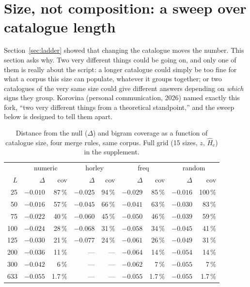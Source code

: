 \documentclass[11pt,a4paper]{article}
\newcommand{\Hcn}{\hat H_{\mathrm{c}}}
\begin{document}
\section{Size, not composition: a sweep over catalogue length}
\label{sec:sweep}

Section~\ref{sec:ladder} showed that changing the catalogue moves the number. This section asks why. Two very different things could be going on, and only one of them is really about the script: a longer catalogue could simply be too fine for what a corpus this size can populate, whatever it groups together; or two catalogues of the very same size could give different answers depending on \emph{which} signs they group. Korovina (personal communication, 2026) named exactly this fork, ``two very different things from a theoretical standpoint,'' and the sweep below is designed to tell them apart.

\begin{table}[t]
\centering\small
\begin{tabular}{r rr rr rr rr}
\toprule
 & \multicolumn{2}{c}{numeric} & \multicolumn{2}{c}{horley} & \multicolumn{2}{c}{freq} & \multicolumn{2}{c}{random} \\
$L$ & $\Delta$ & cov & $\Delta$ & cov & $\Delta$ & cov & $\Delta$ & cov \\
\midrule
25  & $-0.010$ & 87\,\% & $-0.025$ & 94\,\% & $-0.029$ & 85\,\% & $-0.016$ & 100\,\% \\
50  & $-0.016$ & 57\,\% & $-0.045$ & 66\,\% & $-0.041$ & 63\,\% & $-0.030$ & 83\,\% \\
75  & $-0.022$ & 40\,\% & $-0.060$ & 45\,\% & $-0.050$ & 46\,\% & $-0.039$ & 59\,\% \\
100 & $-0.024$ & 28\,\% & $-0.068$ & 31\,\% & $-0.058$ & 34\,\% & $-0.045$ & 41\,\% \\
125 & $-0.030$ & 21\,\% & $\mathbf{-0.077}$ & 24\,\% & $-0.061$ & 26\,\% & $-0.049$ & 31\,\% \\
200 & $-0.036$ & 11\,\% & --- & --- & $-0.064$ & 14\,\% & $-0.054$ & 14\,\% \\
300 & $-0.042$ & 6\,\% & --- & --- & $-0.062$ & 7\,\% & $-0.055$ & 7\,\% \\
633 & $-0.055$ & 1.7\,\% & --- & --- & $-0.055$ & 1.7\,\% & $-0.055$ & 1.7\,\% \\
\bottomrule
\end{tabular}
\caption{Distance from the null ($\Delta$) and bigram coverage as a function of catalogue size, four merge rules, same corpus. Full grid (15 sizes, $z$, $\Hcn$) in the supplement.}
\label{tab:sweep}
\end{table}
\end{document}
